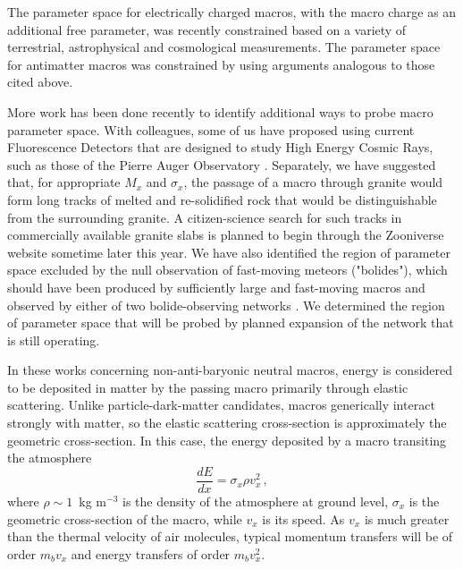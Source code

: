 \documentclass[%
 reprint,
 amsmath,amssymb,
 aps,
 nofootinbib, %
]{revtex4-2}
\begin{document}
    The parameter space for electrically charged macros, with the macro charge as an additional free parameter, was recently constrained \citep{Sidhu2020charge} based on a variety of terrestrial, astrophysical and cosmological measurements. The parameter space for antimatter macros was constrained by \citet{Sidhu2020anti} using arguments analogous to those cited above.

    More work has been done recently to identify additional ways to probe macro parameter space. With colleagues, some of us have proposed \citep{Sidhu2018auv} using current Fluorescence Detectors that are designed to study High Energy Cosmic Rays, such as those of the Pierre Auger Observatory \citep{Abraham2010}. Separately, we have suggested \citep{Sidhu2019granite} that, for appropriate $M_x$ and $\sigma_x$, the passage of a macro through granite would form long tracks of melted and re-solidified rock that would be distinguishable from the surrounding granite. A citizen-science search for such tracks in commercially available granite slabs is planned to begin through the Zooniverse website sometime later this year. We have also identified the region of parameter space excluded by the null observation of fast-moving meteors ("bolides"), which should have been produced by sufficiently large and fast-moving macros and observed by either of two bolide-observing networks \citep{Sidhu2019bolide}. We determined the region of parameter space that will be probed by planned expansion of the network that is still operating.

    In these works concerning non-anti-baryonic neutral macros, energy is considered to be deposited in matter by the passing macro primarily through elastic scattering. Unlike particle-dark-matter candidates, macros generically interact strongly with matter, so the elastic scattering cross-section is approximately the geometric cross-section. In this case, the energy deposited by a macro transiting the atmosphere 
    \begin{equation}\label{eq:dedx}
        \frac{dE}{dx} = \sigma_x \rho v_x^2\,,
    \end{equation}
    where $\rho \sim 1\,$ kg m$^{-3}$ is the density of the atmosphere at ground level, $\sigma_x$ is the geometric cross-section of the macro, while $v_x$ is its speed. As $v_x$ is much greater than the thermal velocity of air molecules, typical momentum transfers will be of order $m_b v_{x}$ and energy transfers of order $m_b v_{x}^2$.
\end{document}
